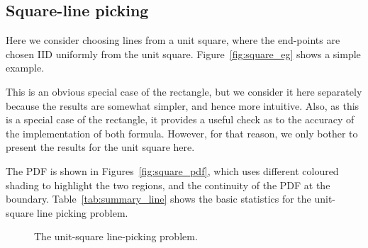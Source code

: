 \subsection{Square-line picking}
\label{sec:square_line}

Here we consider choosing lines from a unit square, where the
end-points are chosen IID uniformly from the unit
square. Figure~\ref{fig:square_eg} shows a simple example.

This is an obvious special case of the rectangle, but we consider it
here separately because the results are somewhat simpler, and hence
more intuitive. Also, as this is a special case of the rectangle, it
provides a useful check as to the accuracy of the implementation of
both formula. However, for that reason, we only bother to present the
results for the unit square here.

The PDF is shown in Figures~\ref{fig:square_pdf}, which uses different
coloured shading to highlight the two regions, and the continuity of
the PDF at the boundary. Table~\ref{tab:summary_line} shows the basic
statistics for the unit-square line picking problem.

\begin{figure}[htbp]
  \begin{center}
    \hspace{3mm}
    \caption{The unit-square line-picking problem.}
  \end{center} 
\vspace{-4mm}
\end{figure}

